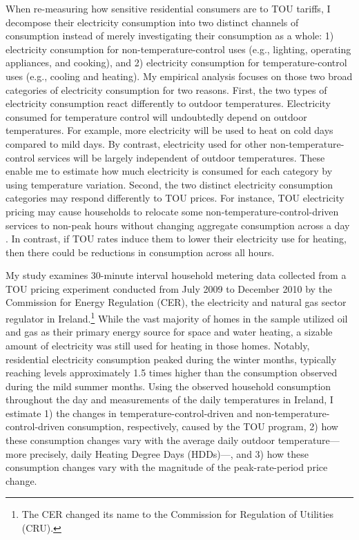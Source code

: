 When re-measuring how sensitive residential consumers are to TOU tariffs, I decompose their electricity consumption into two distinct channels of consumption instead of merely investigating their consumption as a whole: 1) electricity consumption for non-temperature-control uses (e.g., lighting, operating appliances, and cooking), and 2) electricity consumption for temperature-control uses (e.g., cooling and heating). My empirical analysis focuses on those two broad categories of electricity consumption for two reasons. First, the two types of electricity consumption react differently to outdoor temperatures. Electricity consumed for temperature control will undoubtedly depend on outdoor temperatures. For example, more electricity will be used to heat on cold days compared to mild days. By contrast, electricity used for other non-temperature-control services will be largely independent of outdoor temperatures. These enable me to estimate how much electricity is consumed for each category by using temperature variation. Second, the two distinct electricity consumption categories may respond differently to TOU prices. For instance, TOU electricity pricing may cause households to relocate some non-temperature-control-driven services to non-peak hours without changing aggregate consumption across a day \citep{Residential-Response-to-Critical-Peak-Pricing-of-Electricity_California-Evidence_Herter-and-Wayland_2010, Empowering-Consumers-through-Data-and-Smart-Technology_HML_2016}. In contrast, if TOU rates induce them to lower their electricity use for heating, then there could be reductions in consumption across all hours. 

My study examines 30-minute interval household metering data collected from a TOU pricing experiment conducted from July 2009 to December 2010 by the Commission for Energy Regulation (CER), the electricity and natural gas sector regulator in Ireland.\footnote{The CER changed its name to the Commission for Regulation of Utilities (CRU).} While the vast majority of homes in the sample utilized oil and gas as their primary energy source for space and water heating, a sizable amount of electricity was still used for heating in those homes. Notably, residential electricity consumption peaked during the winter months, typically reaching levels approximately 1.5 times higher than the consumption observed during the mild summer months. Using the observed household consumption throughout the day and measurements of the daily temperatures in Ireland, I estimate 1) the changes in temperature-control-driven and non-temperature-control-driven consumption, respectively, caused by the TOU program, 2) how these consumption changes vary with the average daily outdoor temperature---more precisely, daily Heating Degree Days (HDDs)---, and 3) how these consumption changes vary with the magnitude of the peak-rate-period price change.  

